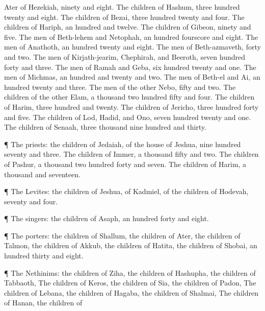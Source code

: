 {Ater of
Hezekiah,
ninety and
eight.
The
children of
Hashum,
three
hundred
twenty and
eight.
The
children of
Bezai,
three
hundred
twenty and
four.
The
children of
Hariph, an
hundred and
twelve.
The
children of
Gibeon,
ninety and
five.
The
men of
Beth-lehem and
Netophah, an
hundred
fourscore and
eight.
The
men of
Anathoth, an
hundred
twenty and
eight.
The
men of
Beth-azmaveth,
forty and
two.
The
men of
Kirjath-jearim,
Chephirah, and
Beeroth,
seven
hundred
forty and
three.
The
men of
Ramah and
Geba,
six
hundred
twenty and
one.
The
men of
Michmas, an
hundred and
twenty and
two.
The
men of
Beth-el and
Ai, an
hundred
twenty and
three.
The
men of the
other
Nebo,
fifty and
two.
The
children of the
other
Elam, a
thousand two
hundred
fifty and
four.
The
children of
Harim,
three
hundred and
twenty.
The
children of
Jericho,
three
hundred
forty and
five.
The
children of
Lod,
Hadid, and
Ono,
seven
hundred
twenty and
one.
The
children of
Senaah,
three
thousand
nine
hundred and
thirty.
\par }{\PP {}¶ The
priests: the
children of
Jedaiah, of the
house of
Jeshua,
nine
hundred
seventy and
three.
The
children of
Immer, a
thousand
fifty and
two.
The
children of
Pashur, a
thousand two
hundred
forty and
seven.
The
children of
Harim, a
thousand and
seventeen.
\par }{\PP {}¶ The
Levites: the
children of
Jeshua, of
Kadmiel,
{} of the
children of
Hodevah,
seventy and
four.
\par }{\PP {}¶ The
singers: the
children of
Asaph, an
hundred
forty and
eight.
\par }{\PP {}¶ The
porters: the
children of
Shallum, the
children of
Ater, the
children of
Talmon, the
children of
Akkub, the
children of
Hatita, the
children of
Shobai, an
hundred
thirty and
eight.
\par }{\PP {}¶ The
Nethinims: the
children of
Ziha, the
children of
Hashupha, the
children of
Tabbaoth,
The
children of
Keros, the
children of
Sia, the
children of
Padon,
The
children of
Lebana, the
children of
Hagaba, the
children of
Shalmai,
The
children of
Hanan, the
children of
}
